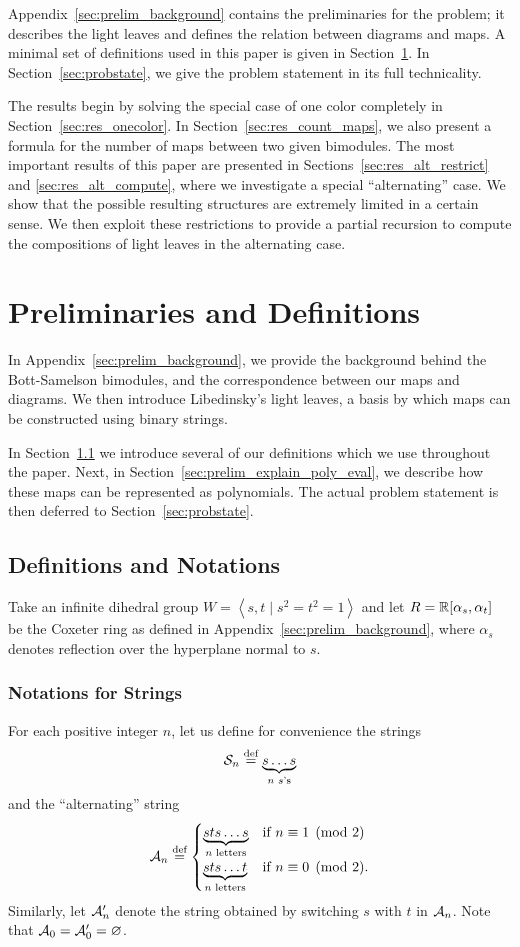 Appendix~\ref{sec:prelim_background} contains the preliminaries for the problem; it describes the light leaves and defines the relation between diagrams and maps.  A minimal set of definitions used in this paper is given in Section~\ref{sec:prelim}.  
In Section~\ref{sec:probstate}, we give the problem statement in its full technicality.

The results begin by solving the special case of one color completely in Section~\ref{sec:res_onecolor}.  In Section~\ref{sec:res_count_maps}, we also present a formula for the number of maps between two given bimodules.  The most important results of this paper are presented in Sections~\ref{sec:res_alt_restrict} and \ref{sec:res_alt_compute}, where we investigate a special ``alternating'' case.  We show that the possible resulting structures are extremely limited in a certain sense.  We then exploit these restrictions to provide a partial recursion to compute the compositions of light leaves in the alternating case.

\section{Preliminaries and Definitions}
\label{sec:prelim}
In Appendix~\ref{sec:prelim_background}, we provide the background behind the Bott-Samelson bimodules, and the correspondence between our maps and diagrams.  We then introduce Libedinsky's light leaves, a basis by which maps can be constructed using binary strings.

In Section~\ref{sec:prelim_def_notation} we introduce several of our definitions which we use throughout the paper.  Next, in Section~\ref{sec:prelim_explain_poly_eval}, we describe how these maps can be represented as polynomials.  The actual problem statement is then deferred to Section~\ref{sec:probstate}.
\subsection{Definitions and Notations}
\label{sec:prelim_def_notation}
Take an infinite dihedral group $W=\left<s,t\mid s^2=t^2=1\right>$ and let $R = \RR[\alpha_s, \alpha_t]$ be the Coxeter ring as defined in Appendix~\ref{sec:prelim_background}, where $\alpha_s$ denotes reflection over the hyperplane normal to $s$.  
\subsubsection{Notations for Strings}
For each positive integer $n$, let us define for convenience the strings
\[ \SS_n \defeq \underbrace{s \dots s}_{\text{$n$ $s$'s}} \] 
and the ``alternating'' string
\[
	\AA_n \defeq
	\begin{cases}
		\underbrace{sts\dots s}_{\text{$n$ letters}} & \text{if } n \equiv 1 \pmod{2} \\
		\underbrace{sts\dots t}_{\text{$n$ letters}} & \text{if } n \equiv 0 \pmod{2}. 
	\end{cases}
\]
Similarly, let $\AA_n'$ denote the string obtained by switching $s$ with $t$ in $\AA_n$.  Note that $\AA_0 = \AA_0' = \varnothing$.

